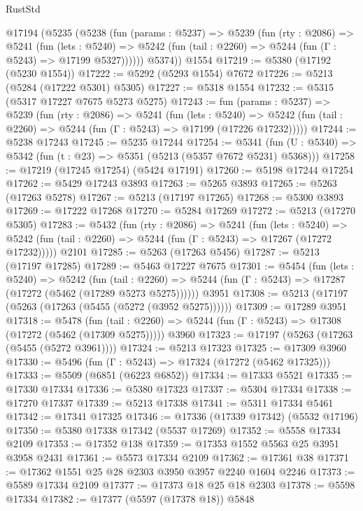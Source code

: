 \begin{lexlean}{RustStd}
\begin{coremodule}
    @17194
      (@5235
        (@5238
          (fun (params : @5237) =>
          @5239
            (fun (rty : @2086) =>
            @5241
              (fun (lets : @5240) =>
              @5242 (fun (tail : @2260) => @5244 (fun (Γ : @5243) => @17199 @5327))))))
        @5374))
    @1554
@17219 := @5380 (@17192 (@5230 @1554))
@17222 := @5292 (@5293 @1554) @7672
@17226 := @5213 (@5284 (@17222 @5301) @5305)
@17227 := @5318 @1554
@17232 := @5315 (@5317 @17227 @7675 @5273 @5275)
@17243 := fun (params : @5237) =>
  @5239
    (fun (rty : @2086) =>
    @5241
      (fun (lets : @5240) =>
      @5242 (fun (tail : @2260) => @5244 (fun (Γ : @5243) => @17199 (@17226 @17232)))))
@17244 := @5238 @17243
@17245 := @5235 @17244
@17254 := @5341
    (fun (U : @5340) => @5342 (fun (t : @23) => @5351 (@5213 (@5357 @7672 @5231) @5368)))
@17258 := @17219 (@17245 @17254) (@5424 @17191)
@17260 := @5198 @17244 @17254
@17262 := @5429 @17243 @3893
@17263 := @5265 @3893
@17265 := @5263 (@17263 @5278)
@17267 := @5213 (@17197 @17265)
@17268 := @5300 @3893
@17269 := @17222 @17268
@17270 := @5284 @17269
@17272 := @5213 (@17270 @5305)
@17283 := @5432
    (fun (rty : @2086) =>
    @5241
      (fun (lets : @5240) =>
      @5242 (fun (tail : @2260) => @5244 (fun (Γ : @5243) => @17267 (@17272 @17232)))))
    @2101
@17285 := @5263 (@17263 @5456)
@17287 := @5213 (@17197 @17285)
@17289 := @5463 @17227 @7675
@17301 := @5454
    (fun (lets : @5240) =>
    @5242
      (fun (tail : @2260) =>
      @5244 (fun (Γ : @5243) => @17287 (@17272 (@5462 (@17289 @5273 @5275))))))
    @3951
@17308 := @5213 (@17197 (@5263 (@17263 (@5455 (@5272 (@3952 @5275))))))
@17309 := @17289 @3951
@17318 := @5478
    (fun (tail : @2260) => @5244 (fun (Γ : @5243) => @17308 (@17272 (@5462 (@17309 @5275)))))
    @3960
@17323 := @17197 (@5263 (@17263 (@5455 (@5272 @3961))))
@17324 := @5213 @17323
@17325 := @17309 @3960
@17330 := @5496 (fun (Γ : @5243) => @17324 (@17272 (@5462 @17325)))
@17333 := @5509 (@6851 (@6223 @6852))
@17334 := @17333 @5521
@17335 := @17330 @17334
@17336 := @5380 @17323
@17337 := @5304 @17334
@17338 := @17270 @17337
@17339 := @5213 @17338
@17341 := @5311 @17334 @5461
@17342 := @17341 @17325
@17346 := @17336 (@17339 @17342) (@5532 @17196)
@17350 := @5380 @17338 @17342 (@5537 @17269)
@17352 := @5558 @17334 @2109
@17353 := @17352 @138
@17359 := @17353 @1552 @5563 @25 @3951 @3958 @2431
@17361 := @5573 @17334 @2109
@17362 := @17361 @38
@17371 := @17362 @1551 @25 @28 @2303 @3950 @3957 @2240 @1604 @2246
@17373 := @5589 @17334 @2109
@17377 := @17373 @18 @25 @18 @2303
@17378 := @5598 @17334
@17382 := @17377 (@5597 (@17378 @18)) @5848

\end{coremodule}
\end{lexlean}

